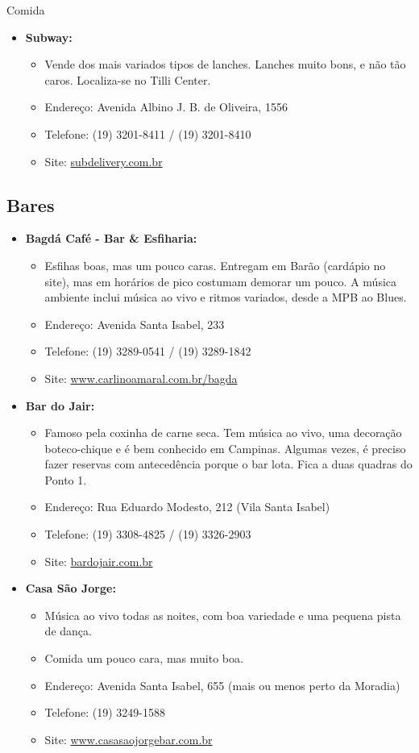 \begin{story}{Comida}
\begin{itemize}
\item \textbf{Subway:}
\begin{itemize}
\item Vende dos mais variados tipos de lanches. Lanches muito bons, e não tão caros. Localiza-se no Tilli Center.
\item Endereço: Avenida Albino J. B. de Oliveira, 1556
\item Telefone: (19) 3201-8411 / (19) 3201-8410
\item Site: \url{subdelivery.com.br}
\end{itemize}

\end{itemize}

\subsection*{Bares}

\begin{itemize}

\item \textbf{Bagdá Café - Bar \& Esfiharia:}
\begin{itemize}
\item Esfihas boas, mas um pouco caras. Entregam em Barão (cardápio no site), mas em horários de pico costumam demorar um pouco. A música ambiente inclui música ao vivo e ritmos variados, desde a MPB ao Blues.
\item Endereço: Avenida Santa Isabel, 233
\item Telefone: (19) 3289-0541 / (19) 3289-1842
\item Site: \url{www.carlinoamaral.com.br/bagda} 
\end{itemize}

\item \textbf{Bar do Jair:}
\begin{itemize}
\item Famoso pela coxinha de carne seca. Tem música ao vivo, uma decoração boteco-chique e é bem conhecido em Campinas. Algumas vezes, é preciso fazer reservas com antecedência porque o bar lota. Fica a duas quadras do Ponto 1.
\item Endereço: Rua Eduardo Modesto, 212 (Vila Santa Isabel)
\item Telefone: (19) 3308-4825 / (19) 3326-2903
\item Site: \url{bardojair.com.br}
\end{itemize}

\item \textbf{Casa São Jorge:}
\begin{itemize}
\item Música ao vivo todas as noites, com boa variedade e uma pequena pista de dança.
\item Comida um pouco cara, mas muito boa.
\item Endereço: Avenida Santa Isabel, 655 (mais ou menos perto da Moradia)
\item Telefone: (19) 3249-1588
\item Site: \url{www.casasaojorgebar.com.br}
\end{itemize}


\end{itemize}
\end{story}
